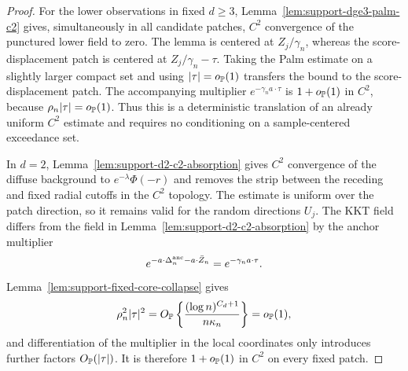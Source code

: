 \begin{proof}
For the lower observations in fixed \(d\ge3\),
Lemma~\ref{lem:support-dge3-palm-c2} gives, simultaneously in all candidate
patches, \(C^2\) convergence of the punctured lower field to zero.  The lemma
is centered at \(Z_j/\gamma_n\), whereas the score-displacement patch is
centered at \(Z_j/\gamma_n-\tau\). Taking the Palm estimate on a slightly
larger compact set and using \(|\tau|=o_{\mathbb P}(1)\) transfers the bound to the
score-displacement patch. The accompanying multiplier
\(e^{-\gamma_na\cdot\tau}\) is \(1+o_{\mathbb P}(1)\) in \(C^2\), because
\(\rho_n|\tau|=o_{\mathbb P}(1)\).  Thus this is a deterministic translation of an
already uniform \(C^2\) estimate and requires no conditioning on a
sample-centered exceedance set.

In \(d=2\), Lemma~\ref{lem:support-d2-c2-absorption} gives \(C^2\)
convergence of the diffuse background to \(e^{-\lambda}\Phi(-r)\) and removes
the strip between the receding and fixed radial cutoffs in the \(C^2\)
topology.
The estimate is uniform over the patch direction, so it remains valid for the
random directions \(U_j\). The KKT field differs from the field in
Lemma~\ref{lem:support-d2-c2-absorption}
by the anchor multiplier
\[
 e^{-a\cdot\Delta_n^{\rm anc}-a\cdot\bar Z_n}
 =e^{-\gamma_na\cdot\tau}.
\]
Lemma~\ref{lem:support-fixed-core-collapse} gives
\[
 \rho_n^2|\tau|^2
 =O_{\mathbb P}\left\{\frac{(\log n)^{C_d+1}}{n\kappa_n}\right\}
 =o_{\mathbb P}(1),
\]
and differentiation of the multiplier in the local coordinates only
introduces further factors \(O_{\mathbb P}(|\tau|)\).
It is therefore \(1+o_{\mathbb P}(1)\) in \(C^2\) on every fixed patch.


\end{proof}
